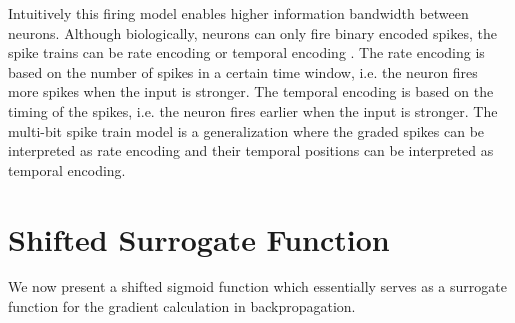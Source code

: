     Intuitively this firing model enables higher information bandwidth between neurons. Although biologically, neurons can only fire binary encoded spikes, the spike trains can be rate encoding \cite{jphysiol.1962.sp006837} or temporal encoding \cite{doi:10.1073/pnas.0610368104}. The rate encoding is based on the number of spikes in a certain time window, i.e. the neuron fires more spikes when the input is stronger. The temporal encoding is based on the timing of the spikes, i.e. the neuron fires earlier when the input is stronger.
    The multi-bit spike train model is a generalization where the graded spikes can be interpreted as rate encoding and their temporal positions can be interpreted as temporal encoding. 

\section{Shifted Surrogate Function}
\label{sec:shifted-surrogate-function}
    We now present a shifted sigmoid function which essentially serves as a surrogate function for the gradient calculation in backpropagation. 

